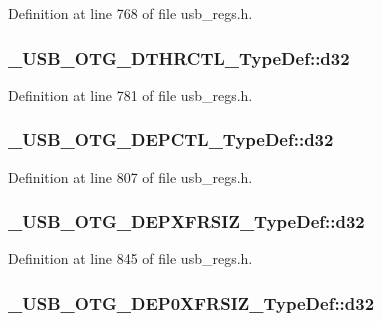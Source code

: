 Definition at line 768 of file usb\-\_\-regs.\-h.

\hypertarget{group___u_s_b___o_t_g___d_r_i_v_e_r_ga4c8322898391b3df3f8c2eaaaa831cd6}{
\subsubsection[{d32}]{ \-\_\-\-U\-S\-B\-\_\-\-O\-T\-G\-\_\-\-D\-T\-H\-R\-C\-T\-L\-\_\-\-Type\-Def\-::d32}}\label{group___u_s_b___o_t_g___d_r_i_v_e_r_ga4c8322898391b3df3f8c2eaaaa831cd6}


Definition at line 781 of file usb\-\_\-regs.\-h.

\hypertarget{group___u_s_b___o_t_g___d_r_i_v_e_r_ga606834f84b3675107103bc88973835cb}{
\subsubsection[{d32}]{ \-\_\-\-U\-S\-B\-\_\-\-O\-T\-G\-\_\-\-D\-E\-P\-C\-T\-L\-\_\-\-Type\-Def\-::d32}}\label{group___u_s_b___o_t_g___d_r_i_v_e_r_ga606834f84b3675107103bc88973835cb}


Definition at line 807 of file usb\-\_\-regs.\-h.

\hypertarget{group___u_s_b___o_t_g___d_r_i_v_e_r_gaf21925209991fac54719ba1172162a9e}{
\subsubsection[{d32}]{ \-\_\-\-U\-S\-B\-\_\-\-O\-T\-G\-\_\-\-D\-E\-P\-X\-F\-R\-S\-I\-Z\-\_\-\-Type\-Def\-::d32}}\label{group___u_s_b___o_t_g___d_r_i_v_e_r_gaf21925209991fac54719ba1172162a9e}


Definition at line 845 of file usb\-\_\-regs.\-h.

\hypertarget{group___u_s_b___o_t_g___d_r_i_v_e_r_ga0ee1cacbd541f2985a9648dba956963b}{
\subsubsection[{d32}]{ \-\_\-\-U\-S\-B\-\_\-\-O\-T\-G\-\_\-\-D\-E\-P0\-X\-F\-R\-S\-I\-Z\-\_\-\-Type\-Def\-::d32}}\label{group___u_s_b___o_t_g___d_r_i_v_e_r_ga0ee1cacbd541f2985a9648dba956963b}


